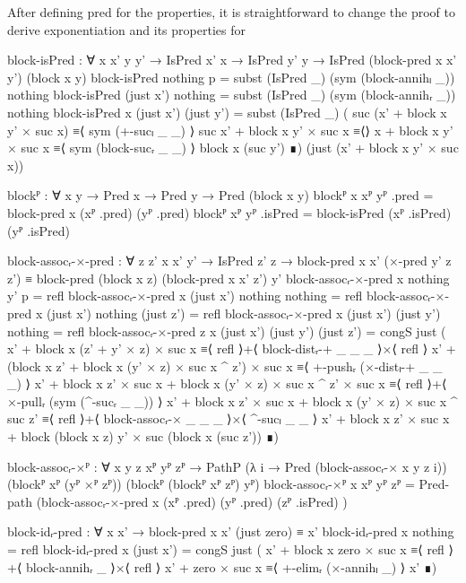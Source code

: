 After defining pred for the properties, it is straightforward to change the
proof to derive exponentiation and its properties for 
\begin{code}[hide]
  block-isPred :
    ∀ {x x' y y'} → IsPred x' x → IsPred y' y →
    IsPred (block-pred x x' y') (block x y)
  block-isPred nothing p = subst (IsPred _) (sym (block-annihₗ _)) nothing
  block-isPred (just x') nothing =
    subst (IsPred _) (sym (block-annihᵣ _)) nothing
  block-isPred {x} (just x') (just y') =
    subst (IsPred _)
      ( suc (x' + block x y' × suc x) ≡⟨ sym (+-sucₗ _ _) ⟩
        suc x' + block x y' × suc x   ≡⟨⟩
        x + block x y' × suc x         ≡⟨ sym (block-sucᵣ _ _) ⟩
        block x (suc y')               ∎)
      (just (x' + block x y' × suc x))

  blockᴾ : ∀ {x y} → Pred x → Pred y → Pred (block x y)
  blockᴾ {x} xᴾ yᴾ .pred = block-pred x (xᴾ .pred) (yᴾ .pred)
  blockᴾ xᴾ yᴾ .isPred = block-isPred (xᴾ .isPred) (yᴾ .isPred)

  block-assocᵣ-×-pred :
    ∀ {z z'} x x' y' → IsPred z' z →
    block-pred x x' (×-pred y' z z') ≡
    block-pred (block x z) (block-pred x x' z') y'
  block-assocᵣ-×-pred x nothing y' p = refl
  block-assocᵣ-×-pred x (just x') nothing nothing = refl
  block-assocᵣ-×-pred x (just x') nothing (just z') = refl
  block-assocᵣ-×-pred x (just x') (just y') nothing = refl
  block-assocᵣ-×-pred {z} x (just x') (just y') (just z') =
    congS just
      ( x' + block x (z' + y' × z) × suc x                                       ≡⟨ refl ⟩+⟨ block-distᵣ-+ _ _ _ ⟩×⟨ refl ⟩
        x' + (block x z' + block x (y' × z) × suc x ^ z') × suc x               ≡⟨ +-pushᵣ (×-distₗ-+ _ _ _) ⟩
        x' + block x z' × suc x + block x (y' × z) × suc x ^ z' × suc x         ≡⟨ refl ⟩+⟨ ×-pullᵣ (sym (^-sucᵣ _ _)) ⟩
        x' + block x z' × suc x + block x (y' × z) × suc x ^ suc z'             ≡⟨ refl ⟩+⟨ block-assocᵣ-× _ _ _ ⟩×⟨ ^-sucₗ _ _ ⟩
        x' + block x z' × suc x + block (block x z) y' × suc (block x (suc z')) ∎)

  block-assocᵣ-×ᴾ :
    ∀ {x y z} xᴾ yᴾ zᴾ →
    PathP (λ i → Pred (block-assocᵣ-× x y z i))
      (blockᴾ xᴾ (yᴾ ×ᴾ zᴾ)) (blockᴾ (blockᴾ xᴾ zᴾ) yᴾ)
  block-assocᵣ-×ᴾ {x} xᴾ yᴾ zᴾ =
    Pred-path (block-assocᵣ-×-pred x (xᴾ .pred) (yᴾ .pred) (zᴾ .isPred) )

  block-idᵣ-pred : ∀ x x' → block-pred x x' (just zero) ≡ x'
  block-idᵣ-pred x nothing = refl
  block-idᵣ-pred x (just x') =
    congS just
      ( x' + block x zero × suc x ≡⟨ refl ⟩+⟨ block-annihᵣ _ ⟩×⟨ refl ⟩
        x' + zero × suc x         ≡⟨ +-elimᵣ (×-annihₗ _) ⟩
        x'                        ∎)


\end{code}
